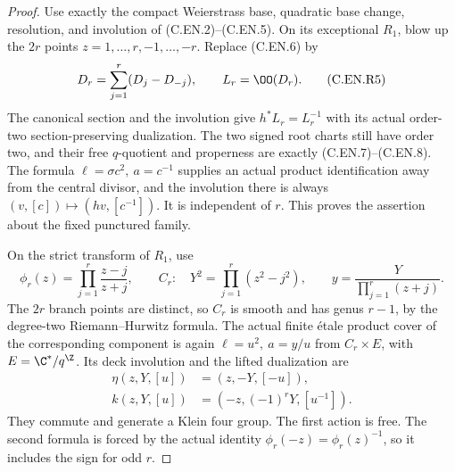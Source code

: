 \begin{proof}
Use exactly the compact Weierstrass base, quadratic
base change, resolution, and involution of
(C.EN.2)--(C.EN.5). On its exceptional $R_1$,
blow up the $2r$ points
$z=1,\ldots,r,-1,\ldots,-r$.
Replace (C.EN.6) by
\[
 D_r=\sum_{j=1}^r(D_j-D_{-j}),\qquad L_r=\OO(D_r).
                                                               \tag{C.EN.R5}\label{cdp:eq:C.EN.R5}
\]
The canonical section and the involution give
$h^*L_r=L_r^{-1}$ with its actual order-two
section-preserving dualization. The two signed
root charts still have order two, and their
free $q$-quotient and properness are exactly
(C.EN.7)--(C.EN.8). The formula
$\ell=\sigma c^2,\ a=c^{-1}$ supplies an
actual product identification away from the
central divisor, and the involution there
is always $(v,[c])\mapsto(hv,[c^{-1}])$.
It is independent of $r$. This proves the
assertion about the fixed punctured family.

On the strict transform of $R_1$, use
\[
 \phi_r(z)=\prod_{j=1}^r\frac{z-j}{z+j},\qquad
 C_r:\quad Y^2=\prod_{j=1}^r(z^2-j^2),\qquad
 y=\frac{Y}{\prod_{j=1}^r(z+j)}.
                                                               \tag{C.EN.R6}\label{cdp:eq:C.EN.R6}
\]
The $2r$ branch points are distinct, so $C_r$
is smooth and has genus $r-1$, by the
degree-two Riemann--Hurwitz formula.
The actual finite \'etale product cover
of the corresponding component is again
$\ell=u^2,\ a=y/u$ from $C_r\times E$,
with $E=\C^*/q^{\Z}$. Its deck involution
and the lifted dualization are
\[
 \begin{split}
 \eta(z,Y,[u])&=(z,-Y,[-u]),\\
 k(z,Y,[u])&=(-z,(-1)^rY,[u^{-1}]).
 \end{split}                                             \tag{C.EN.R7}\label{cdp:eq:C.EN.R7}
\]
They commute and generate a Klein four group.
The first action is free. The second formula
is forced by the actual identity
$\phi_r(-z)=\phi_r(z)^{-1}$, so it includes
the sign for odd $r$.


\end{proof}
